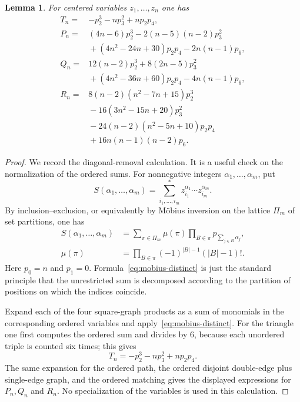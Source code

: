 \documentclass[11pt]{amsart}
\numberwithin{equation}{section}
\newtheorem{lemma}[theorem]{Lemma}
\begin{document}
\begin{lemma}\label{lem:degree-six-sums}
For centered variables $z_1,\ldots,z_n$ one has
\[
\begin{aligned}
T_n={}&-p_2^3-np_3^2+np_2p_4,\\
P_n={}&(4n-6)p_2^3-2(n-5)(n-2)p_3^2\\
&{} +(4n^2-24n+30)p_2p_4-2n(n-1)p_6,\\
Q_n={}&12(n-2)p_2^3+8(2n-5)p_3^2\\
&{} +(4n^2-36n+60)p_2p_4-4n(n-1)p_6,\\
R_n={}&8(n-2)(n^2-7n+15)p_2^3\\
&{} -16(3n^2-15n+20)p_3^2\\
&{} -24(n-2)(n^2-5n+10)p_2p_4\\
&{} +16n(n-1)(n-2)p_6 .
\end{aligned}
\]
\end{lemma}

\begin{proof}
We record the diagonal-removal calculation.  It is a useful check on the
normalization of the ordered sums.  For nonnegative integers
$\alpha_1,\ldots,\alpha_m$, put
\[
S(\alpha_1,\ldots,\alpha_m)=
\sum_{i_1,\ldots,i_m}^{*} z_{i_1}^{\alpha_1}\cdots z_{i_m}^{\alpha_m}.
\]
By inclusion--exclusion, or equivalently by M\"obius inversion on the lattice
$\Pi_m$ of set partitions, one has
\begin{equation}\label{eq:mobius-distinct}
\begin{aligned}
S(\alpha_1,\ldots,\alpha_m)
&=\sum_{\pi\in\Pi_m}\mu(\pi)
  \prod_{B\in\pi} p_{\sum_{j\in B}\alpha_j},\\
\mu(\pi)&=\prod_{B\in\pi}(-1)^{|B|-1}(|B|-1)! .
\end{aligned}
\end{equation}
Here $p_0=n$ and $p_1=0$.  Formula~\eqref{eq:mobius-distinct} is just the
standard principle that the unrestricted sum is decomposed according to the
partition of positions on which the indices coincide.

Expand each of the four square-graph products as a sum of monomials in the
corresponding ordered variables and apply~\eqref{eq:mobius-distinct}.  For the
triangle one first computes the ordered sum and divides by $6$, because each
unordered triple is counted six times; this gives
\[
T_n=-p_2^3-np_3^2+np_2p_4.
\]
The same expansion for the ordered path, the ordered disjoint double-edge plus
single-edge graph, and the ordered matching gives the displayed expressions for
$P_n,Q_n$ and $R_n$.  No specialization of the variables is used in this
calculation.
\end{proof}
\end{document}
